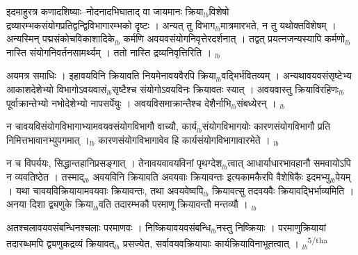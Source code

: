 \documentclass[article,12pt,a4paper]{memoir}%
\newcounter{parCount}
\begin{document}
	  \pstart \leavevmode%
	इदमाहुरत्र कणादशिष्याः--नोदनादभिघाताद् वा जायमानः क्रिया{\tiny $_{lb}$}विशेषो द्रव्यारम्भकसंयोगप्रतिद्वन्द्विविभागारम्भको दृष्टः । अन्यत् तु विभाग{\tiny $_{lb}$}मात्रमारभते, न तु यथोक्तविशेषम् । अन्यस्मिन् पद्मसंकोचविकाशादिके{\tiny $_{lb}$} कर्मणि अवयवसंयोगनिवृत्तेरदर्शनात् । तद्वत् प्रयत्नजन्यस्यापि कर्मणो{\tiny $_{lb}$} नास्ति संयोगनिवर्तनसामर्थ्यम् । ततो नास्ति द्रव्यनिवृत्तिरिति ।
	{}
	\pend%
      {\tiny $_{lb}$}

	  \pstart \leavevmode%
	अयमत्र समाधिः । इहावयविनि क्रियावति नियमेनावयवैरपि क्रिया{\tiny $_{lb}$}वद्भिर्भवितव्यम् । अन्यथावयवसंसृष्टेभ्य आकाशदेशेभ्यो विभागोऽवयवासं{\tiny $_{lb}$}सृष्टैश्च संयोगोऽवयविनः क्रियावतः स्यात् । अवयवास्तु क्रियाविरहिणः{\tiny $_{lb}$} पूर्वाक्रान्तेभ्यो नभोदेशेभ्यो नापसर्पेयुः । अवयविसमाक्रान्तैश्च देशैर्नाभि{\tiny $_{lb}$}संबध्येरन् ।
	{}
	\pend%
      {\tiny $_{lb}$}

	  \pstart \leavevmode%
	न चावयविसंयोगविभागाभ्यामवयवसंयोगविभागौ वाच्यौ, कार्य{\tiny $_{lb}$}संयोगविभागयोः कारणसंयोगविभागौ प्रति निमित्तभावानभ्युपगमात् ।{\tiny $_{lb}$} कारणसंयोगविभागावेव हि कार्यसंयोगविभागावारभेते ।
	{}
	\pend%
      {\tiny $_{lb}$}

	  \pstart \leavevmode%
	न च विपर्ययः, सिद्धान्तहानिप्रसङ्गात् । तेनावयवावयविनां पृथग्देश{\tiny $_{lb}$}त्वात् \leavevmode{} आधार्याधारभावहानौ समवायोऽपि न व्यवतिष्ठेत । तस्माद्{\tiny $_{lb}$} अवयविनि क्रियावति अवयवाः क्रियावन्तः इत्यकामकैरपि वैशेषिकैः इदमभ्यु{\tiny $_{lb}$}पेयम् । यथा चावयविक्रियायामवयवाः क्रियावन्तः, तथा अवयवेष्वपि{\tiny $_{lb}$} क्रियावत्सु तदवयवैः क्रियावद्भिर्भाव्यमिति । अनया दिशा द्व्यणुके क्रिया{\tiny $_{lb}$}वति तदारम्भकौ परमाणू क्रियावन्तौ मन्तव्यौ ।
	{}
	\pend%
      {\tiny $_{lb}$}

	  \pstart \leavevmode%
	अतश्चलावयवसंबन्धिनश्चलाः परमाणवः । निष्क्रियावयवसंबन्धि{\tiny $_{lb}$}नस्तु निष्क्रियाः । परमाणुक्रियायां तदारब्धमपि द्व्यणुकद्रव्यं क्रियावत्{\tiny $_{lb}$} प्रसज्येत, सर्वावयवक्रियायाः कार्यक्रियाविनाभूतत्वात् ।
	{}
	\pend%
      {\tiny $_{lb}$}\textsuperscript{\textenglish{5/tha}}
\end{document}
